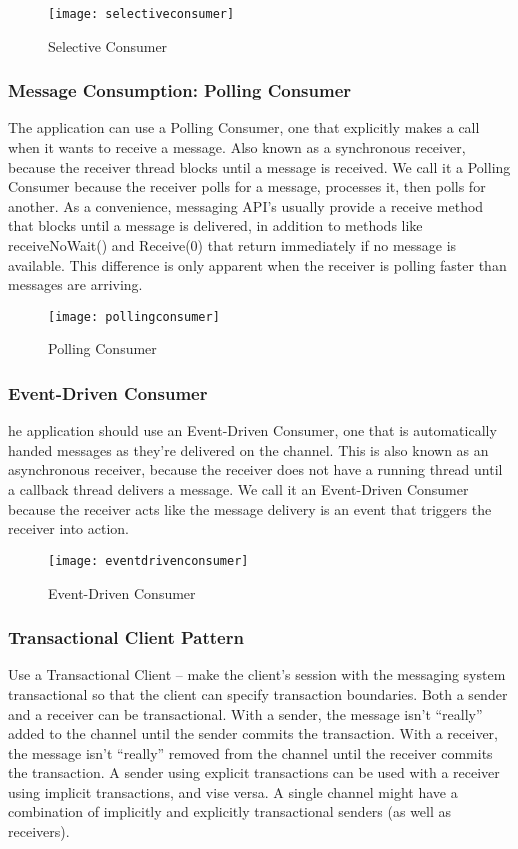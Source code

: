 \begin{figure}[H]
  \center
  \texttt{[image: selectiveconsumer]}
  \caption{Selective Consumer}
\end{figure}

\subsubsection{Message Consumption: Polling Consumer}
The application can use a Polling Consumer, one that explicitly makes a call when it wants to receive a message. Also known as a synchronous receiver, because the receiver thread blocks until a message is received. We call it a Polling Consumer because the receiver polls for a message, processes it, then polls for another. As a convenience, messaging API’s usually provide a receive method that blocks until a message is delivered, in addition to methods like receiveNoWait() and Receive(0) that return immediately if no message is available. This difference is only apparent when the receiver is polling faster than messages are arriving.

\begin{figure}[H]
  \center
  \texttt{[image: pollingconsumer]}
  \caption{Polling Consumer}
\end{figure}

\subsubsection{Event-Driven Consumer}
he application should use an Event-Driven Consumer, one that is automatically handed messages as they’re delivered on the channel. This is also known as an asynchronous receiver, because the receiver does not have a running thread until a callback thread delivers a message. We call it an Event-Driven Consumer because the receiver acts like the message delivery is an event that triggers the receiver into action.

\begin{figure}[H]
  \center
  \texttt{[image: eventdrivenconsumer]}
  \caption{Event-Driven Consumer}
\end{figure}

\subsubsection{Transactional Client Pattern}
Use a Transactional Client – make the client’s session with the messaging system transactional so that the client can specify transaction boundaries. Both a sender and a receiver can be transactional. With a sender, the message isn’t “really” added to the channel until the sender commits the transaction. With a receiver, the message isn’t “really” removed from the channel until the receiver commits the transaction. A sender using explicit transactions can be used with a receiver using implicit transactions, and vise versa. A single channel might have a combination of implicitly and explicitly transactional senders (as well as receivers).

